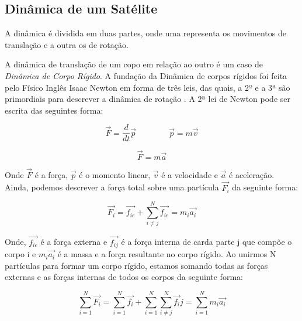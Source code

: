 
\subsection{Dinâmica de um Satélite}

A dinâmica é dividida em duas partes, onde uma representa os movimentos de translação e a outra os de rotação.




A dinâmica de translação de um copo em relação ao outro é um caso de \textit{Dinâmica de Corpo Rígido}. A fundação da Dinâmica de corpos rígidos foi feita pelo Físico Inglês Isaac Newton em forma de três leis, das quais, a 2º e a 3ª são primordiais para descrever a dinâmica de rotação \cite{Snider}. A 2ª lei de Newton pode ser escrita das seguintes forma:

\begin{equation}\label{eq:fma}
  \vec{F}=\frac{d}{dt}\vec{p}\quad\quad\quad\quad\vec{p}=m\vec{v}
\end{equation}

\begin{equation}
  \vec{F}=m\vec{a}
\end{equation}

Onde $\vec{F}$ é a força, $\vec{p}$ é o momento linear, $\vec{v}$ é a velocidade e $\vec{a}$ é  aceleração. Ainda, podemos descrever a força total sobre uma partícula $\vec{F_i}$ da seguinte forma:

\begin{equation}\label{eq:Fi}
\vec{F_i}=\vec{f_{ie}}+\sum_{i\neq j}^{N}{\vec{f_{ie}}} = m_i\vec{a_i}
\end{equation}
 
 Onde, $\vec{f_{ie}}$ é a força externa e $\vec{f_{ij}}$ é a força interna de carda parte j que compõe o corpo i e $m_i\vec{a_i}$ é a massa e a força resultante no corpo rígido. Ao unirmos N partículas para formar um corpo rígido, estamos somando todas as forças externas e as forças internas de todos os corpos da seguinte forma:

\begin{equation}
  \sum_{i=1}^{N}{\vec{F_i}}=\sum_{i=1}^{N}{\vec{f_i}}+\sum_{i=1}^{N}{\sum_{i\neq j}^{N}{\vec{f_i}j=}}\sum_{i=1}^{N}{m_i\vec{a_i}} 
\end{equation}

